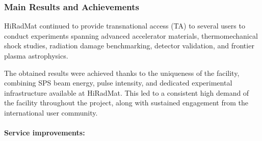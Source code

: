 
\subsubsection*{Main Results and Achievements}

HiRadMat continued to provide transnational access (TA) to several users to conduct experiments spanning advanced accelerator materials, thermomechanical shock studies, radiation damage benchmarking, detector validation, and frontier plasma astrophysics. 

The obtained results were achieved thanks to the uniqueness of the facility, combining SPS beam energy, pulse intensity, and dedicated experimental infrastructure available at HiRadMat. This led to a consistent high demand of the facility throughout the project, along with sustained engagement from the international user community.


\paragraph{Service improvements:}

